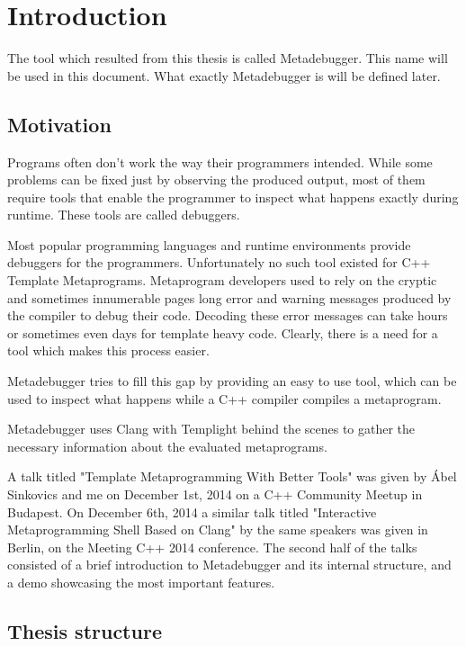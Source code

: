
\chapter{Introduction} \label{introduction}

The tool which resulted from this thesis is called Metadebugger. This name will
be used in this document. What exactly Metadebugger is will be defined later.

\section{Motivation}

Programs often don't work the way their programmers intended. While some
problems can be fixed just by observing the produced output, most of them
require tools that enable the programmer to inspect what happens exactly
during runtime. These tools are called debuggers.

Most popular programming languages and runtime environments provide debuggers
for the programmers. Unfortunately no such tool existed for C++ Template
Metaprograms\cite{cpp14}. Metaprogram developers used to rely on the cryptic
and sometimes innumerable pages long error and warning messages produced by the
compiler to debug their code. Decoding these error messages can take hours or
sometimes even days for template heavy code\cite{sinkovics-phd,boost-spirit}.
Clearly, there is a need for a tool which makes this process easier.

Metadebugger tries to fill this gap by providing an easy to use tool, which can
be used to inspect what happens while a C++ compiler compiles a metaprogram.

Metadebugger uses Clang with Templight behind the scenes to gather the
necessary information about the evaluated metaprograms.

A talk titled "Template Metaprogramming With Better Tools" was given by Ábel
Sinkovics and me on December 1st, 2014 on a C++ Community
Meetup in Budapest\cite{cpp-meetup}. On December 6th, 2014 a similar talk
titled "Interactive Metaprogramming Shell Based on Clang" by the same speakers
was given in Berlin, on the Meeting C++ 2014 conference\cite{meeting-cpp}.
The second half of the talks consisted of a brief introduction to Metadebugger
and its internal structure, and a demo showcasing the most important features.

\section{Thesis structure}

